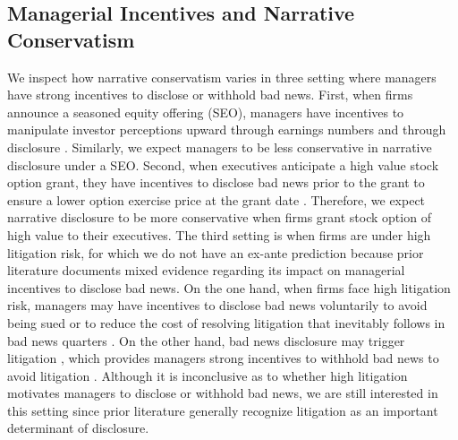 \documentclass[letterpaper,11pt]{article}
\begin{document}
\begin{spacing}{1.5}

\subsection{Managerial Incentives and Narrative Conservatism}
We inspect how narrative conservatism varies in three setting where managers have strong incentives to disclose or withhold bad news. First, when firms announce a seasoned equity offering (SEO), managers have incentives to manipulate investor perceptions upward through earnings numbers \cite{teohEarningsManagementUnderperformance1998} and through disclosure \cite{langVoluntaryDisclosureEquity2000}. Similarly, we expect managers to be less conservative in narrative disclosure under a SEO. Second, when executives anticipate a high value stock option grant, they have incentives to disclose bad news prior to the grant to ensure a lower option exercise price at the grant date \cite{aboodyCEOStockOption2000,bakerStockOptionCompensation2003,mcanallyExecutiveStockOptions2008}. Therefore, we expect narrative disclosure to be more conservative when firms grant stock option of high value to their executives. The third setting is when firms are under high litigation risk, for which we do not have an ex-ante prediction because prior literature documents mixed evidence regarding its impact on managerial incentives to disclose bad news. On the one hand, when firms face high litigation risk, managers may have incentives to disclose bad news voluntarily to avoid being sued or to reduce the cost of resolving litigation that inevitably follows in bad news quarters \cite{skinnerWhyFirmsVoluntarily1994, skinnerEarningsDisclosuresStockholder1997}. On the other hand, bad news disclosure may trigger litigation \cite{francisShareholderLitigationCorporate1994}, which provides managers strong incentives to withhold bad news to avoid litigation \cite{rogersShareholderLitigationChanges2009}. Although it is inconclusive as to whether high litigation motivates managers to disclose or withhold bad news, we are still interested in this setting since prior literature generally recognize litigation as an important determinant of disclosure.


\end{spacing}
\end{document}
